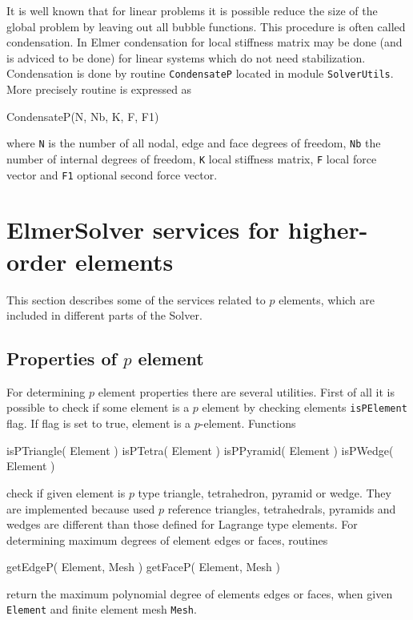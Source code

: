 It is well known that for linear problems it is possible reduce the size of the global problem by leaving out all bubble functions. This procedure is often called condensation. In Elmer condensation for local stiffness matrix may be done (and is adviced to be done) for linear systems which do not need stabilization. Condensation is done by routine \texttt{CondensateP} located in module \texttt{SolverUtils}. More precisely routine is expressed as

\ttbegin
CondensateP(N, Nb, K, F, F1)
\ttend

\noindent where \texttt{N} is the number of all nodal, edge and face degrees of freedom, \texttt{Nb} the number of internal degrees of freedom, \texttt{K} local stiffness matrix, \texttt{F} local force vector and \texttt{F1} optional second force vector.

\section{ElmerSolver services for higher-order elements} 

This section describes some of the services related to $p$ elements, which are included in different parts of the Solver. 

\subsection{Properties of $p$ element}

For determining $p$ element properties there are several utilities. First of all it is possible to check if some element is a $p$ element by checking elements \texttt{isPElement} flag. If flag is set to true, element is a $p$-element. Functions 

\ttbegin
isPTriangle( Element )
isPTetra( Element )
isPPyramid( Element )
isPWedge( Element )
\ttend

\noindent check if given element is $p$ type triangle, tetrahedron, pyramid or wedge. They are implemented because used $p$ reference triangles, tetrahedrals, pyramids and wedges are different than those defined for Lagrange type elements.  For determining maximum degrees of element edges or faces, routines 

\ttbegin
getEdgeP( Element, Mesh )
getFaceP( Element, Mesh )
\ttend 

\noindent return the maximum polynomial degree of elements edges or faces, when given \texttt{Element} and finite element mesh \texttt{Mesh}.

